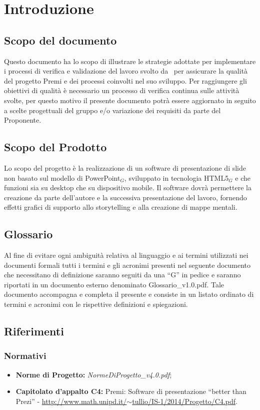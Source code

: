 \section{Introduzione}

\subsection{Scopo del documento}
Questo documento ha lo scopo di illustrare le strategie adottate per implementare i processi di verifica e validazione del lavoro svolto da \gruppo\ per assicurare la qualità del progetto Premi e dei processi coinvolti nel suo sviluppo. Per raggiungere gli obiettivi di qualità è necessario un processo di verifica continua sulle attività svolte, per questo motivo il presente documento potrà essere aggiornato in seguito a scelte progettuali del gruppo e/o variazione dei requisiti da parte del Proponente.

\subsection{Scopo del Prodotto}
Lo scopo del progetto è la realizzazione di un software di presentazione di slide non basato sul modello di PowerPoint$_{G}$, sviluppato in tecnologia HTML5$_{G}$ e che funzioni sia su desktop che su dispositivo mobile. Il software dovrà permettere la creazione da parte dell'autore e la successiva presentazione del lavoro, fornendo effetti grafici di supporto allo storytelling e alla creazione di mappe mentali.

\subsection{Glossario}
Al fine di evitare ogni ambiguità relativa al linguaggio e ai termini utilizzati nei documenti formali tutti i termini e gli acronimi presenti nel seguente documento che necessitano di definizione saranno seguiti da una ``G'' in pedice e saranno riportati in un documento esterno denominato Glossario\_v1.0.pdf. Tale documento accompagna e completa il presente e consiste in un listato ordinato di termini e acronimi con le rispettive definizioni e spiegazioni.

\subsection{Riferimenti}
\subsubsection{Normativi}
\begin{itemize}
	\item \textbf{Norme di Progetto:} \textit{NormeDiProgetto\_v4.0.pdf};
	\item \textbf{Capitolato d'appalto C4:} Premi: Software di presentazione ``better than Prezi'' - \href{http://www.math.unipd.it/~tullio/IS-1/2014/Progetto/C4.pdf}{http://www.math.unipd.it/$\sim$tullio/IS-1/2014/Progetto/C4.pdf}.
\end{itemize}

